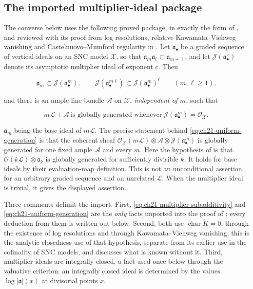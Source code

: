 \subsection{The imported multiplier-ideal package}
\label{sec:ch21-multiplier-input}

The converse below uses the following proved package, in exactly the form of
\cite[Appendix~B]{BFJ16}, and reviewed with its proof from log resolutions,
relative Kawamata--Viehweg vanishing and Castelnuovo--Mumford regularity in
.  Let $\mathfrak a_\bullet$ be a
graded sequence of vertical ideals on an SNC model $\mathcal X$, so that
$\mathfrak a_m\mathfrak a_\ell\subset\mathfrak a_{m+\ell}$, and let
$\mathcal J(\mathfrak a_\bullet^{\,c})$ denote its asymptotic multiplier
ideal of exponent $c$.  Then

\begin{equation}
\label{eq:ch21-multiplier-subadditivity}
 \mathfrak a_m\subset
 \mathcal J(\mathfrak a_\bullet^m),
 \qquad
 \mathcal J(\mathfrak a_\bullet^{m\ell})
 \subset\mathcal J(\mathfrak a_\bullet^m)^\ell
 \qquad(m,\ell\geq1),
\end{equation}

and there is an ample line bundle $\mathcal A$ on $\mathcal X$,
\emph{independent of $m$}, such that

\begin{equation}
\label{eq:ch21-uniform-generation}
 m\mathcal L+\mathcal A\ \text{is globally generated whenever}\
 \mathcal J(\mathfrak a_\bullet^m)=\mathcal O_{\mathcal X},
\end{equation}

$\mathfrak a_m$ being the base ideal of $m\mathcal L$.  The precise
statement behind \eqref{eq:ch21-uniform-generation} is that the coherent
sheaf
$\mathcal O_{\mathcal X}(m\mathcal L)\otimes\mathcal A\otimes
\mathcal J(\mathfrak a_\bullet^m)$ is globally generated for one fixed ample $\mathcal A$ and every $m$.
Here the hypothesis of \cite[Theorem~B.8]{BFJ16} is that
$\mathcal O(k\mathcal L)\otimes\mathfrak a_k$ is globally generated
for sufficiently divisible $k$.  It holds for base ideals by their
evaluation-map definition.  This is not an unconditional assertion for an
arbitrary graded sequence and an unrelated $\mathcal L$.  When the
multiplier ideal is trivial, it gives the displayed assertion.

Three comments delimit the import.  First,
\eqref{eq:ch21-multiplier-subadditivity} and
\eqref{eq:ch21-uniform-generation} are the \emph{only} facts imported into
the proof of \Cref{thm:ch21-model-consistency}; every deduction from them is
written out below.  Second, both use
$\operatorname{char}\widetilde K=0$, through the existence of log
resolutions and through Kawamata--Viehweg vanishing; this is the analytic
closedness use of that hypothesis, separate from its earlier use in the
cofinality of SNC models, and
 discusses what is known without it.  Third,
multiplier ideals are integrally closed, a fact used once below through the
valuative criterion: an integrally closed ideal is determined by the values
$\log|\mathfrak a|(x)$ at divisorial points $x$.

